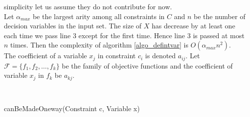 simplicity let us assume they do not contribute for now. \\ 
Let $\alpha_{max}$ be the largest arity among all constraints in $C$ and $n$ be the number of decision variables in the 
input set. The size of $X$ has decrease by at least one each time we pass line 3 except for the first time. Hence line 3 
is passed at most $n$ times. Then the complexity of algorithm \ref{algo_defintvar} is $O(\alpha_{max} n^2)$. \\ \medskip
The coefficient of a variable $x_j$ in constraint $c_i$ is denoted $a_{ij}$. Let $\mathcal{F} = \{f_1,f_2,\dots ,f_k\}$ 
be the family of objective functions  and the coefficient of variable $x_j$ 
in $f_k$ be $a_{kj}$.  \\  

\IncMargin{1em}
\begin{algorithm}[H]

\algdata
{}
\BlankLine
{}
 \\
\Return{} \true\;
 \caption{canBeMadeOneway(\textsf{Constraint} c, \textsf{Variable} x)} \label{algo_checkoneway}
\end{algorithm}
\DecMargin{1em}

